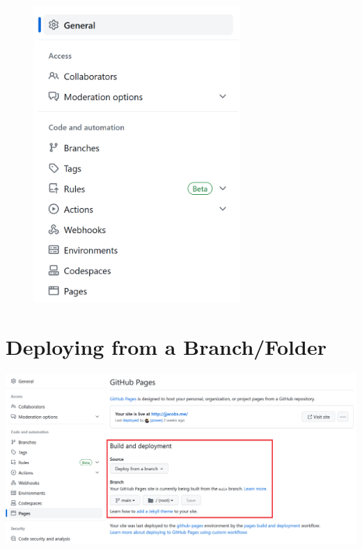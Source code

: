 \documentclass[
  letterpaper,
  DIV=11,
  numbers=noendperiod,
  oneside]{scrreprt}
\begin{document}
\begin{figure}

{\centering \includegraphics[width=0.7\textwidth,height=\textheight]{assets/img/ch00/gh_pages.png}

}

\end{figure}

\hypertarget{deploying-from-a-branchfolder}{%
\section{Deploying from a
Branch/Folder}\label{deploying-from-a-branchfolder}}

\includegraphics{assets/img/ch00/gh_pages_2.png}
\end{document}
